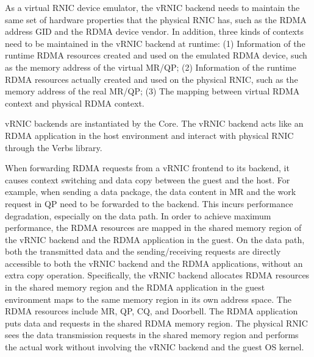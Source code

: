 As a virtual RNIC device emulator, the vRNIC backend needs to maintain the same set of hardware properties that the physical RNIC has, such as the RDMA address GID and the RDMA device vendor. In addition, three kinds of contexts need to be maintained in the vRNIC backend at runtime:
(1) Information of the runtime RDMA resources created and used on the emulated RDMA device, such as the memory address of the virtual MR/QP;
(2) Information of the runtime RDMA resources actually created and used on the physical RNIC, such as the memory address of the real MR/QP;
(3) The mapping between virtual RDMA context and physical RDMA context.

vRNIC backends are instantiated by the \sys Core.
The vRNIC backend acts like an RDMA application in the host environment and interact with physical RNIC through the Verbs library.


When forwarding RDMA requests from a vRNIC frontend to its backend, it causes context switching and data copy between the guest and the host. For example, when sending a data package, the data content in MR and the work request in QP need to be forwarded to the backend. This incurs performance degradation, especially on the data path. In order to achieve maximum performance, the RDMA resources are mapped in the shared memory region of the vRNIC backend and the RDMA application in the guest. On the data path, both the transmitted data and the sending/receiving requests are directly accessible to both the vRNIC backend and the RDMA applications, without an extra copy operation. Specifically, the vRNIC backend allocates RDMA resources in the shared memory region and the RDMA application in the guest environment maps to the same memory region in its own address space. The RDMA resources include MR, QP, CQ, and Doorbell. The RDMA application puts data and requests in the shared RDMA memory region. The physical RNIC sees the data transmission requests in the shared memory region and performs the actual work without involving the vRNIC backend and the guest OS kernel.

